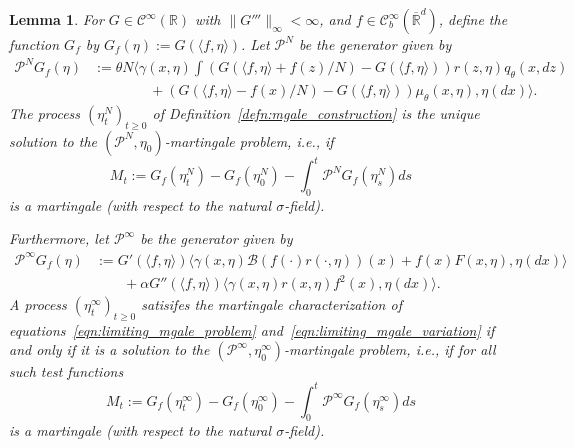 \documentclass[12pt]{article}
\newtheorem{lemma}[theorem]{Lemma}
\newcommand{\IR}{\mathbb R}
\newcommand{\Pgen}{\mathcal{P}}    %
\numberwithin{equation}{section}
\begin{document}
\begin{lemma}
    \label{def: MP definition of limit}
For $G \in \mathcal{C}^{\infty}(\IR)$ with $\|G'''\|_\infty<\infty$,
and 
$f \in \mathcal{C}_{b}^\infty(\overline{\IR}^d)$, define the 
function $G_f$ by 
$G_f(\eta):=G (\langle f, \eta \rangle)$.
Let $\Pgen^N$ be the generator given by
\begin{equation}
\begin{aligned}
    \Pgen^N G_f(\eta)
    &:=
    \theta N \bigg\langle
    \gamma(x, \eta)
        \int 
        \left(G(\langle f, \eta \rangle + f(z)/N) - G(\langle f, \eta \rangle)\right)
        r(z,\eta) q_\theta(x,dz)
    \\ & \qquad \qquad {}
    +
    \left(G(\langle f, \eta \rangle - f(x)/N) - G(\langle f, \eta \rangle)\right)
    \mu_\theta(x, \eta),
    \eta(dx) \bigg\rangle .
\end{aligned}
\end{equation}
The process $(\eta^N_t)_{t \geq 0}$ of Definition~\ref{defn:mgale_construction}
is the unique solution to the $(\Pgen^N, \eta_0)$-martingale problem, i.e., if
$$
    M_t :=
    G_f(\eta^N_t) - G_f(\eta^N_0)
    - \int_{0}^{t}\Pgen^N G_f(\eta^N_s)ds
$$
is a martingale (with respect to the natural $\sigma$-field). 

Furthermore, let $\Pgen^\infty$ be the generator given by
\begin{equation}
    \label{eq: Limit Generator Definition}
\begin{aligned}
\Pgen^{\infty} G_f(\eta)
    &:= G'(\langle f, \eta \rangle)
                   \big\langle
                        \gamma(x, \eta)
                            \mathcal{B}\left(
                            f(\cdot) r(\cdot, \eta)
                            \right)(x)
                    +
                    f(x) F(x, \eta),
                    \eta(dx)
                    \big\rangle \\
               &\qquad {}
               + \alpha G''(\langle f, \eta \rangle)
                  \big\langle
                    \gamma\left( x, \eta \right)
                    r\left(x,\eta \right)
                    f^2(x),
                    \eta (dx)
                    \big\rangle  .
\end{aligned}    
\end{equation}
A process $(\eta^{\infty}_t)_{t \geq 0}$ 
satisifes the martingale characterization of equations~\eqref{eqn:limiting_mgale_problem}
and~\eqref{eqn:limiting_mgale_variation}
if and only if it is a solution 
to the $(\Pgen^{\infty}, \eta^\infty_0)$-martingale problem, i.e.,
if for all such test functions 
$$
    M_t :=
    G_f(\eta^{\infty}_t) - G_f(\eta^\infty_0)
    - \int_{0}^{t}\Pgen^{\infty}G_f(\eta^{\infty}_s)ds
$$
is a martingale (with respect to the natural $\sigma$-field). 
\end{lemma}
\end{document}
